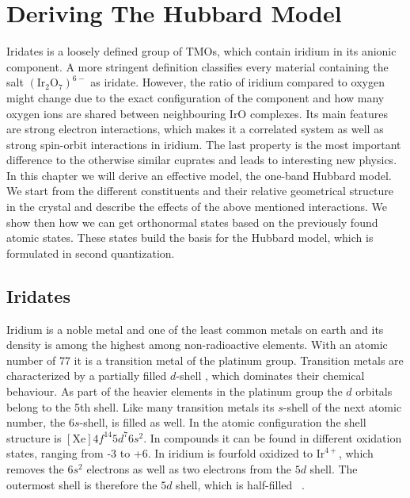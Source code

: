   

\chapter{Deriving The Hubbard Model}

Iridates is a loosely defined group of TMOs, which contain iridium in  its anionic component. 
A more stringent definition classifies every material containing the salt $(\mathrm{Ir}_2\mathrm{O}_7)^{6-}$ as iridate.
However, the ratio of iridium compared to oxygen might change due to the exact configuration of the component and how many oxygen ions are shared between neighbouring IrO complexes.
Its main features are strong electron interactions, which makes it a correlated system as well as strong spin-orbit interactions in iridium.
The last property is the most important difference to the otherwise similar cuprates and leads to interesting new physics.
In this chapter we will derive an effective model, the one-band Hubbard model. 
We start from the different constituents and their relative  geometrical structure in the crystal
and describe the effects of the above mentioned interactions. 
We show then how we can get orthonormal states based on the previously found atomic states.
These states build the basis for the Hubbard model, which is formulated in second quantization.


\section{Iridates}
Iridium is a noble metal and one of the least common metals on earth and 
its density is among the highest among non-radioactive elements.
With an atomic number of 77 it is a transition metal of the platinum group.
Transition metals are characterized by a partially filled $d$-shell , which dominates their chemical behaviour.
As part of the heavier elements in the platinum group the $d$ orbitals belong to the 5th shell. 
Like many transition metals its $s$-shell of the next atomic number, the $6s$-shell, is filled as well.
In the atomic configuration the shell structure is $[\mathrm{Xe}]4f^{14}5d^7 6s^2$.
In compounds it can be found in different oxidation states, ranging from -3 to +6.
In \Sriro iridium is fourfold oxidized to $\mathrm{Ir}^{4+}$, 
which removes the $6s^2$ electrons as well as two electrons from the $5d$ shell.
The outermost shell is therefore the $5d$ shell, which is half-filled ~\cite{Abragam70}.


